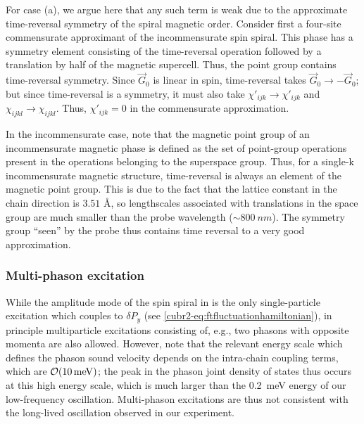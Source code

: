 For case (a), we argue here that any such term is weak due to the approximate time-reversal symmetry of the spiral magnetic order.
Consider first a four-site commensurate approximant of the incommensurate spin spiral.
This phase has a symmetry element consisting of the time-reversal operation followed by a translation by half of the magnetic supercell.
Thus, the point group contains time-reversal symmetry.
Since $\vec{G}_0$ is linear in spin, time-reversal takes $\vec{G}_0\rightarrow-\vec{G}_0$; but since time-reversal is a symmetry, it must also take $\chi'_{ijk}\rightarrow\chi'_{ijk}$ and $\chi_{ijkl}\rightarrow\chi_{ijkl}$.
Thus, $\chi'_{ijk}=0$ in the commensurate approximation.

In the incommensurate case, note that the magnetic point group of an incommensurate magnetic phase is defined as the set of point-group operations present in the operations belonging to the superspace group.
Thus, for a single-k incommensurate magnetic structure, time-reversal is always an element of the magnetic point group.
This is due to the fact that the lattice constant in the chain direction is $3.51$ \si{\angstrom}, so lengthscales associated with translations in the space group are much smaller than the probe wavelength ($\sim\qty{800}{nm}$).
The symmetry group ``seen'' by the probe thus contains time reversal to a very good approximation.

\subsubsection{Multi-phason excitation}

While the amplitude mode of the spin spiral in  is the only single-particle excitation which couples to $\delta P_y$ (see \cref{cubr2-eq:ftfluctuationhamiltonian}), in principle multiparticle excitations consisting of, e.g., two phasons with opposite momenta are also allowed.
However, note that the relevant energy scale which defines the phason sound velocity depends on the intra-chain coupling terms, which are $\mathcal{O}(\qty{10}{meV})$; the peak in the phason joint density of states thus occurs at this high energy scale, which is much larger than the \qty{0.2}{meV} energy of our low-frequency oscillation.
Multi-phason excitations are thus not consistent with the long-lived oscillation observed in our experiment.

